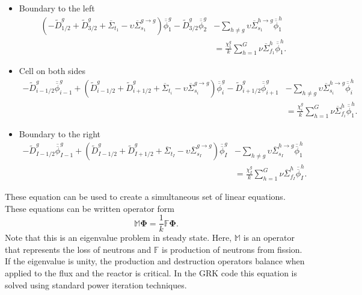 \documentclass{ansconf}
\numberwithin{equation}{section}
\begin{document}
\begin{itemize}
\item Boundary to the left
\begin{align}
    \left(- \widetilde{D}_{1/2}^{g} + \widetilde{D}_{3/2}^{g} + \overline\Sigma_{t_1} - \upsilon\overline\Sigma^{g\rightarrow g}_{s_{1}}\right)\overline{\overline{\phi}}_{1}^g -  \widetilde{D}_{3/2}^{g}
    \overline{\overline{\phi}}_{2}^{g} & - \sum_{h\neq g}\upsilon\overline\Sigma^{h\rightarrow g}_{s_{1}}\overline{\overline{\phi}}_{1}^h \\ & = \frac{\chi_{1}^g} {k}\sum_{h=1}^G\nu\overline\Sigma^{h}_{f_{1}}  \overline{\overline{\phi}}_{1}^h. \nonumber
\end{align}
\item Cell on both sides
\begin{align}
-  \widetilde{D}_{i-1/2}^{g}
    \overline{\overline{\phi}}_{i-1}^{g} + 
    \left(\widetilde{D}_{i-1/2}^{g} + \widetilde{D}_{i+1/2}^{g} + \overline\Sigma_{t_i} - \upsilon\overline\Sigma^{g\rightarrow g}_{s_{i}}\right)\overline{\overline{\phi}}_{i}^g -  \widetilde{D}_{i+1/2}^{g}
    \overline{\overline{\phi}}_{i+1}^{g} & - \sum_{h\neq g}\upsilon\overline\Sigma^{h\rightarrow g}_{s_{i}}\overline{\overline{\phi}}_{i}^h \\ & = \frac{\chi_{i}^g} {k}\sum_{h=1}^G\nu\overline\Sigma^{h}_{f_{i}}  \overline{\overline{\phi}}_{1}^h. \nonumber
\end{align}
\item Boundary to the right
\begin{align}
    -\widetilde{D}_{I-1/2}^{g}
    \overline{\overline{\phi}}_{I-1}^{g} + 
    \left(\widetilde{D}_{I-1/2}^{g} + \widetilde{D}_{I+1/2}^{g} + \overline\Sigma_{t_I} - \upsilon\overline\Sigma^{g\rightarrow g}_{s_{I}}\right)\overline{\overline{\phi}}_{I}^g  & - \sum_{h\neq g}\upsilon\overline\Sigma^{h\rightarrow g}_{s_{I}}\overline{\overline{\phi}}_{1}^h \\ & = \frac{\chi_{I}^g} {k}\sum_{h=1}^G\nu\overline\Sigma^{h}_{f_{I}}  \overline{\overline{\phi}}_{I}^h.
\end{align}
\end{itemize}
These equation can be used to create a simultaneous set of linear equations. These equations can be written operator form
\begin{equation}
    \mathbb{M}\boldsymbol{\Phi} = \frac{1}{k} \mathbb{F}\boldsymbol{\Phi}.
\end{equation}
Note that this is an eigenvalue problem in steady state. Here, $\mathbb{M}$ is an operator that represents the loss of neutrons and $\mathbb{F}$ is production of neutrons from fission. If the eigenvalue is unity, the production and destruction operators balance when applied to the flux and the reactor is critical. In the GRK code this equation is solved using standard power iteration techniques.
\end{document}
